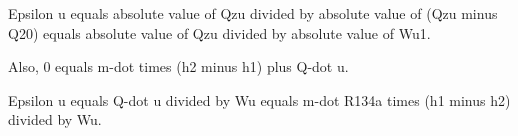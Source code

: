 Epsilon u equals absolute value of Qzu divided by absolute value of (Qzu minus Q20) equals absolute value of Qzu divided by absolute value of Wu1.  

Also, 0 equals m-dot times (h2 minus h1) plus Q-dot u.  

Epsilon u equals Q-dot u divided by Wu equals m-dot R134a times (h1 minus h2) divided by Wu.